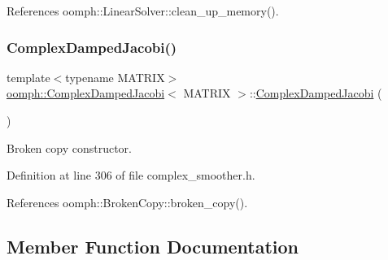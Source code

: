 References oomph\+::\+Linear\+Solver\+::clean\+\_\+up\+\_\+memory().

\mbox{\label{classoomph_1_1ComplexDampedJacobi_a290c1a7f550d0abff01d6bfd69c2fbe0}} 
\subsubsection{\texorpdfstring{Complex\+Damped\+Jacobi()}{ComplexDampedJacobi()}\hspace{0.1cm}{\footnotesize\ttfamily [2/2]}}
{\footnotesize\ttfamily template$<$typename M\+A\+T\+R\+IX$>$ \\
\hyperlink{classoomph_1_1ComplexDampedJacobi}{oomph\+::\+Complex\+Damped\+Jacobi}$<$ M\+A\+T\+R\+IX $>$\+::\hyperlink{classoomph_1_1ComplexDampedJacobi}{Complex\+Damped\+Jacobi} (\begin{DoxyParamCaption}\item[{const \hyperlink{classoomph_1_1ComplexDampedJacobi}{Complex\+Damped\+Jacobi}$<$ M\+A\+T\+R\+IX $>$ \&}]{ }\end{DoxyParamCaption})\hspace{0.3cm}{\ttfamily [inline]}}



Broken copy constructor. 



Definition at line 306 of file complex\+\_\+smoother.\+h.



References oomph\+::\+Broken\+Copy\+::broken\+\_\+copy().



\subsection{Member Function Documentation}
\mbox{\label{classoomph_1_1ComplexDampedJacobi_af7a53121690e157bdd5bc191a31f9892}} 
